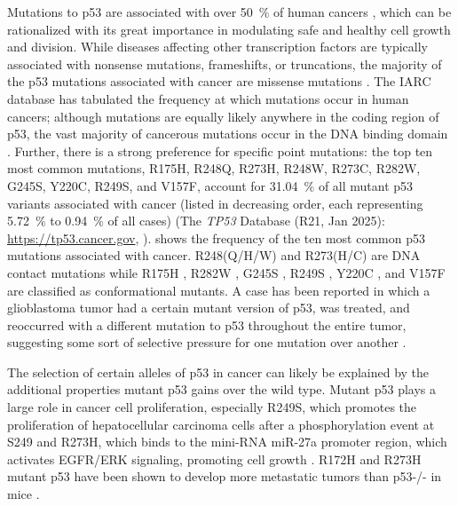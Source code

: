 Mutations to p53 are associated with over \qty{50}{\percent} of human cancers \parencite{hamzehloieRoleTumorProtein2012}, which can be rationalized with its great importance in modulating safe and healthy cell growth and division. While diseases affecting other transcription factors are typically associated with nonsense mutations, frameshifts, or truncations, the majority of the p53 mutations associated with cancer are missense mutations \parencite{hamzehloieRoleTumorProtein2012, baughWhyAreThere2018}. The IARC database has tabulated the frequency at which mutations occur in human cancers; although mutations are equally likely anywhere in the coding region of p53, the vast majority of cancerous mutations occur in the DNA binding domain \parencite{hainautSomaticTP53Mutations2016}. Further, there is a strong preference for specific point mutations: the top ten most common mutations, R175H, R248Q, R273H, R248W, R273C, R282W, G245S, Y220C, R249S, and V157F, account for \qty{31.04}{\percent} of all mutant p53 variants associated with cancer (listed in decreasing order, each representing \qty{5.72}{\percent} to \qty{0.94}{\percent} of all cases) (The \textit{TP53} Database (R21, Jan 2025): \url{https://tp53.cancer.gov}, \parencite{deandradeTP53DatabaseTransition2022, hainautSomaticTP53Mutations2016}).  shows the frequency of the ten most common p53 mutations associated with cancer. R248(Q/H/W) \parencite{ngR248QMutationBeyondP53DNA2015, alvarado-ortizMutantP53GainofFunction2021, asherP53HotspotMutants2003} and R273(H/C) \parencite{tanMutantP53R273HMediates2015, gargVariableMutationsP53R2732020} are DNA contact mutations while R175H \parencite{chiangFunctionMutantP53R175H2021}, R282W \parencite{zhangGainFunctionMutant2016}, G245S \parencite{lepreInsightsEffectG245S2017}, R249S \parencite{wangItTakesTeam2019}, Y220C \parencite{joergerStructuralBasisUnderstanding2006}, and V157F are classified as conformational mutants. A case has been reported in which a glioblastoma tumor had a certain mutant version of p53, was treated, and reoccurred with a different mutation to p53 throughout the entire tumor, suggesting some sort of selective pressure for one mutation over another \parencite{leeSpatiotemporalGenomicArchitecture2017}.

The selection of certain alleles of p53 in cancer can likely be explained by the additional properties mutant p53 gains over the wild type. Mutant p53 plays a large role in cancer cell proliferation, especially R249S, which promotes the proliferation of hepatocellular carcinoma cells after a phosphorylation event at S249 \parencite{wangItTakesTeam2019, liaoMutantP53Gains2017} and R273H, which binds to the mini-RNA miR-27a promoter region, which activates EGFR/ERK signaling, promoting cell growth \parencite{wangMutantP53R273HGains2013}. R172H and R273H mutant p53 have been shown to develop more metastatic tumors than p53-/- in mice \parencite{langGainFunctionP532004, oliveMutantP53Gain2004}.

